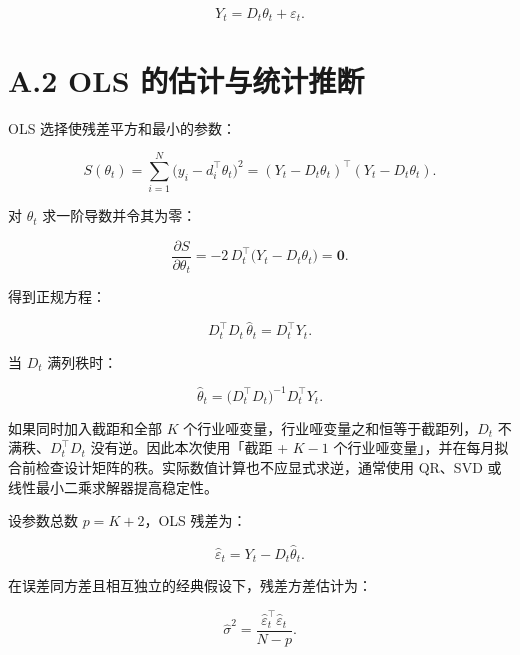 \documentclass[UTF8,a4paper,11pt]{ctexart}
\begin{document}
\begin{equation}
Y_t = D_t \theta_t + \varepsilon_t.
\end{equation}

{}
\section*{A.2 OLS 的估计与统计推断}

OLS 选择使残差平方和最小的参数：

\begin{equation}
S(\theta_t)
= \sum_{i=1}^{N} \bigl(y_i - d_i^{\top} \theta_t\bigr)^2
= (Y_t - D_t \theta_t)^{\top} (Y_t - D_t \theta_t).
\end{equation}

对 $\theta_t$ 求一阶导数并令其为零：

\begin{equation}
\frac{\partial S}{\partial \theta_t}
= -2\, D_t^{\top} \bigl(Y_t - D_t \theta_t\bigr) = \mathbf{0}.
\end{equation}

得到正规方程：

\begin{equation}
D_t^{\top} D_t\, \hat{\theta}_t = D_t^{\top} Y_t.
\end{equation}

当 $D_t$ 满列秩时：

\begin{equation}
\hat{\theta}_t = \bigl(D_t^{\top} D_t\bigr)^{-1} D_t^{\top} Y_t.
\end{equation}

如果同时加入截距和全部 $K$ 个行业哑变量，行业哑变量之和恒等于截距列，$D_t$ 不满秩、$D_t^{\top} D_t$ 没有逆。因此本次使用「截距 + $K-1$ 个行业哑变量」，并在每月拟合前检查设计矩阵的秩。实际数值计算也不应显式求逆，通常使用 QR、SVD 或线性最小二乘求解器提高稳定性。

设参数总数 $p = K+2$，OLS 残差为：

\begin{equation}
\hat{\varepsilon}_t = Y_t - D_t \hat{\theta}_t.
\end{equation}

在误差同方差且相互独立的经典假设下，残差方差估计为：

\begin{equation}
\hat{\sigma}^2 = \frac{\hat{\varepsilon}_t^{\top} \hat{\varepsilon}_t}{N - p}.
\end{equation}
\end{document}

